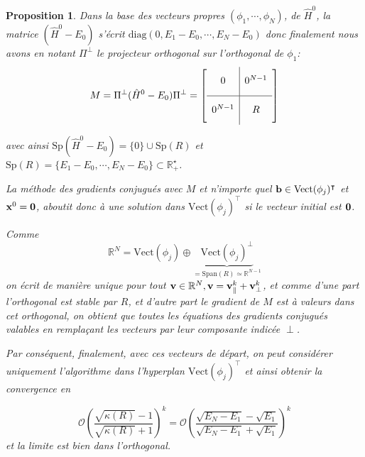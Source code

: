 \documentclass[svgnames,dvipsnames,a4paper,10pt,french]{report}
\newtheorem{proposition}[theorem]{Proposition}
\begin{document}
\begin{proposition}
Dans la base des vecteurs propres $(\phi_1, \cdots, \phi_N)$, de $\hat{H}^0$, la matrice $(\hat{H}^0-E_0)$ s'écrit $\mathrm{diag}(0,E_1-E_0, \cdots, E_N-E_0)$ donc finalement nous avons en notant $\Pi^\perp$ le projecteur orthogonal sur l'orthogonal de $\phi_1$:
\begin{equation}
\label{decomp_sous_esp}
    M = \Pi^\perp (\hat{H}^0-E_0) \Pi^\perp = \renewcommand\arraystretch{2}
\left[
\begin{array}{c|c}
  0 &  0^{N-1}  \\[5pt]
  \hline
  0^{N-1} & R \\[5pt]
\end{array}
\right]
\end{equation}

avec ainsi $\text{Sp}(\hat{H}^0-E_0) = \{0 \} \cup \mathrm{Sp}(R)$ et $\mathrm{Sp}(R) = \{E_1-E_0, \cdots, E_N-E_0\} \subset \mathbb{R}^\star_+$. 


La méthode des gradients conjugués avec $M$ et n'importe quel $\mathbf{b} \in \mathrm{Vect}(\phi_j)^\intercal$ et $\mathbf{x}^0=\mathbf{0}$, aboutit donc  à une solution dans $\mathrm{Vect}(\phi_j)^\intercal$ si le vecteur initial est  $\mathbf{0}$.



Comme 
\begin{equation}
    \mathbb{R}^N = \mathrm{Vect}(\phi_j)\oplus \underbrace{\mathrm{Vect}(\phi_j)^\perp}_{=\mathrm{Span}(R)  \simeq \mathbb{R}^{N-1}}
\end{equation}
on écrit de manière unique pour tout $\mathbf{v}\in\mathbb{R}^N, \mathbf{v}=\mathbf{v}^k_\parallel + \mathbf{v}^k_\perp$, et comme d'une part l'orthogonal est stable par $R$, et d'autre part le gradient de $M$ est à valeurs dans cet orthogonal, on obtient que toutes les équations des gradients conjugués valables en remplaçant les vecteurs par leur composante indicée $\perp$. 

Par conséquent, finalement, avec ces vecteurs de départ, on peut  considérer uniquement l'algorithme dans l'hyperplan $\mathrm{Vect}(\phi_j)^\intercal$ et ainsi obtenir la convergence en 

\begin{equation}
    \mathcal{O}\left( \frac{\sqrt{\kappa (R)} - 1}{\sqrt{\kappa (R)} + 1} \right)^k = \mathcal{O}\left( \frac{\sqrt{E_N-E_1} - \sqrt{E_1}}{\sqrt{E_N-E_1} + \sqrt{E_1}} \right)^k
\end{equation} et la limite est bien dans l'orthogonal.
\end{proposition}
\end{document}
